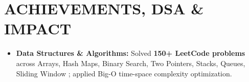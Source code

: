 \documentclass[a4paper,9.5pt]{article}
\begin{document}
\section*{ACHIEVEMENTS, DSA \& IMPACT}
\begin{itemize}
    \item \textbf{Data Structures \& Algorithms:} Solved \textbf{150+ LeetCode problems} across Arrays, Hash Maps, Binary Search, Two Pointers, Stacks, Queues, Sliding Window ; applied Big-O time-space complexity optimization.
\end{itemize}
\end{document}
